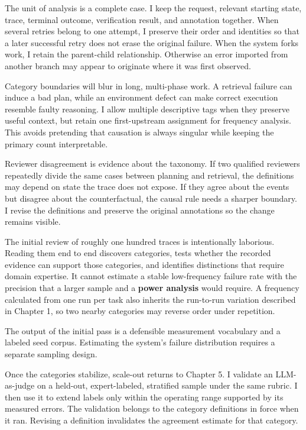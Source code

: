 The unit of analysis is a complete case. I keep the request, relevant starting state, trace, terminal outcome, verification result, and annotation together. When several retries belong to one attempt, I preserve their order and identities so that a later successful retry does not erase the original failure. When the system forks work, I retain the parent-child relationship. Otherwise an error imported from another branch may appear to originate where it was first observed.

Category boundaries will blur in long, multi-phase work. A retrieval failure can induce a bad plan, while an environment defect can make correct execution resemble faulty reasoning. I allow multiple descriptive tags when they preserve useful context, but retain one first-upstream assignment for frequency analysis. This avoids pretending that causation is always singular while keeping the primary count interpretable.

Reviewer disagreement is evidence about the taxonomy. If two qualified reviewers repeatedly divide the same cases between planning and retrieval, the definitions may depend on state the trace does not expose. If they agree about the events but disagree about the counterfactual, the causal rule needs a sharper boundary. I revise the definitions and preserve the original annotations so the change remains visible.

The initial review of roughly one hundred traces is intentionally laborious. Reading them end to end discovers categories, tests whether the recorded evidence can support those categories, and identifies distinctions that require domain expertise. It cannot estimate a stable low-frequency failure rate with the precision that a larger sample and a \textbf{power analysis} would require. A frequency calculated from one run per task also inherits the run-to-run variation described in Chapter 1, so two nearby categories may reverse order under repetition.

The output of the initial pass is a defensible measurement vocabulary and a labeled seed corpus. Estimating the system's failure distribution requires a separate sampling design.

Once the categories stabilize, scale-out returns to Chapter 5. I validate an LLM-as-judge on a held-out, expert-labeled, stratified sample under the same rubric. I then use it to extend labels only within the operating range supported by its measured errors. The validation belongs to the category definitions in force when it ran. Revising a definition invalidates the agreement estimate for that category.

